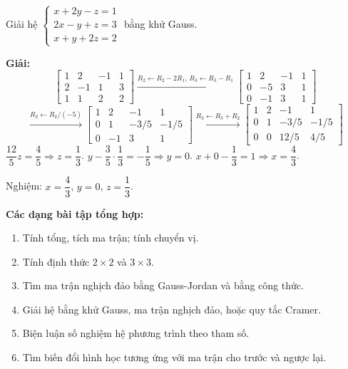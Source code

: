 \documentclass[12pt,a4paper]{article}
\begin{document}
\begin{vidu}
  Giải hệ $\begin{cases} x + 2y - z = 1 \\ 2x - y + z = 3 \\ x + y + 2z = 2 \end{cases}$ bằng khử Gauss.

  \medskip\textbf{Giải:}
  \[
    \left[\begin{array}{ccc|c}1&2&-1&1\\2&-1&1&3\\1&1&2&2\end{array}\right]
    \xrightarrow{R_2 \leftarrow R_2-2R_1,\, R_3 \leftarrow R_3-R_1}
    \left[\begin{array}{ccc|c}1&2&-1&1\\0&-5&3&1\\0&-1&3&1\end{array}\right]
  \]
  \[
    \xrightarrow{R_2 \leftarrow R_2/(-5)}
    \left[\begin{array}{ccc|c}1&2&-1&1\\0&1&-3/5&-1/5\\0&-1&3&1\end{array}\right]
    \xrightarrow{R_3 \leftarrow R_3+R_2}
    \left[\begin{array}{ccc|c}1&2&-1&1\\0&1&-3/5&-1/5\\0&0&12/5&4/5\end{array}\right]
  \]
  $\dfrac{12}{5}z = \dfrac{4}{5} \Rightarrow z = \dfrac{1}{3}$.
  $y - \dfrac{3}{5} \cdot \dfrac{1}{3} = -\dfrac{1}{5} \Rightarrow y = 0$.
  $x + 0 - \dfrac{1}{3} = 1 \Rightarrow x = \dfrac{4}{3}$.

  Nghiệm: $x = \dfrac{4}{3}$, $y = 0$, $z = \dfrac{1}{3}$.
\end{vidu}

\medskip\noindent\textbf{Các dạng bài tập tổng hợp:}
\begin{enumerate}[label=\textbf{Dạng \arabic*:}, leftmargin=*, align=left]
  \item Tính tổng, tích ma trận; tính chuyển vị.
  \item Tính định thức $2\times2$ và $3\times3$.
  \item Tìm ma trận nghịch đảo bằng Gauss-Jordan và bằng công thức.
  \item Giải hệ bằng khử Gauss, ma trận nghịch đảo, hoặc quy tắc Cramer.
  \item Biện luận số nghiệm hệ phương trình theo tham số.
  \item Tìm biến đổi hình học tương ứng với ma trận cho trước và ngược lại.
\end{enumerate}
\end{document}
